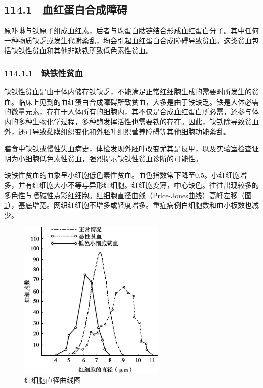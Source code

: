 \subsection{114.1　血红蛋白合成障碍}

原卟啉与铁原子组成血红素，后者与珠蛋白肽链结合形成血红蛋白分子。其中任何一种物质缺乏或发生代谢紊乱，均会引起血红蛋白合成障碍导致贫血。这类贫血包括缺铁性贫血和其他非缺铁所致低色素性贫血。

\subsubsection{114.1.1　缺铁性贫血}

缺铁性贫血是由于体内储存铁缺乏，不能满足正常红细胞生成的需要时所发生的贫血。临床上见到的血红蛋白合成障碍所致贫血，大多是由于铁缺乏。铁是人体必需的微量元素，存在于人体所有的细胞内，其不仅是合成血红蛋白所必需，还参与体内的多种生物化学过程，多种酶发挥活性也需要铁的存在。因此，缺铁除导致贫血外，还可导致黏膜组织变化和外胚叶组织营养障碍等其他细胞功能紊乱。

膳食中缺铁或慢性失血病史，体检发现外胚叶改变尤其是反甲，以及实验室检查证明为小细胞低色素性贫血，强烈提示缺铁性贫血诊断的可能性。

缺铁性贫血的血象呈小细胞低色素性贫血。血色指数常下降至0.5。小红细胞增多，并有红细胞大小不等与异形红细胞。红细胞变薄，中心缺色。往往出现较多的多色性与嗜碱性点彩红细胞。红细胞直径曲线（Price-Jones曲线）高峰左移（图\ref{fig33-6}），基底增宽。网织红细胞不增多或轻度增多。重症病例白细胞数和血小板数也减少。

\begin{figure}[!htbp]
 \centering
 \includegraphics[width=2.76042in,height=3.01042in]{./images/Image00183.jpg}
 \captionsetup{justification=centering}
 \caption{红细胞直径曲线图}
 \label{fig33-6}
  \end{figure} 

